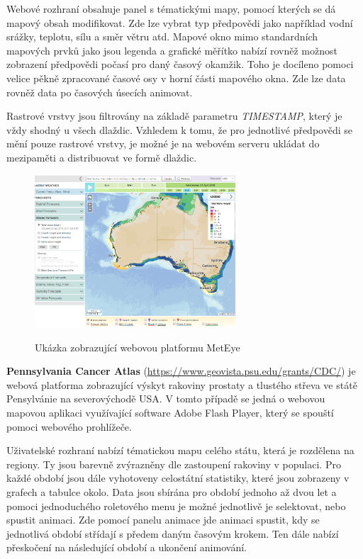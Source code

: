 Webové rozhraní obsahuje panel s tématickými mapy, pomocí kterých se
dá mapový obsah modifikovat. Zde lze vybrat typ předpovědi jako
například vodní srážky, teplotu, sílu a směr větru atd. Mapové okno
mimo standardních mapových prvků jako jsou legenda a grafické měřítko
nabízí rovněž možnost zobrazení předpovědi počasí pro daný časový
okamžik. Toho je docíleno pomoci velice pěkně zpracované časové osy v
horní části mapového okna. Zde lze data rovněž data po časových
úsecích animovat.

Rastrové vrstvy jsou filtrovány na základě parametru
\textit{TIMESTAMP}, který je vždy shodný u všech dlaždic. Vzhledem k
tomu, že pro jednotlivé předpovědi se mění pouze rastrové vrstvy, je
možné je na webovém serveru ukládat do mezipaměti a distribuovat ve formě dlaždic.

\begin{figure}[h!]  \centering
\includegraphics[width=0.67\textwidth]{../img/meteye.png}
	\caption{Ukázka zobrazující webovou platformu MetEye}
	\cite{met-eye}
	\label{fig:met-eye}
\end{figure}

\textbf{Pennsylvania Cancer Atlas}
(\url{https://www.geovista.psu.edu/grants/CDC/}) je webová platforma
zobrazující výskyt rakoviny prostaty a tlustého střeva ve státě
Pensylvánie na severovýchodě USA. V tomto případě se jedná o webovou
mapovou aplikaci využívající software Adobe Flash Player, který se
spouští pomoci webového prohlížeče.

Uživatelské rozhraní nabízí tématickou mapu celého státu, která je
rozdělena na regiony. Ty jsou barevně zvýrazněny dle zastoupení
rakoviny v populaci. Pro každé období jsou dále vyhotoveny celostátní
statistiky, které jsou zobrazeny v grafech a tabulce okolo. Data jsou
sbírána pro období jednoho až dvou let a pomoci jednoduchého
roletového menu je možné jednotlivě je selektovat, nebo spustit
animaci. Zde pomocí panelu animace jde animaci spustit, kdy se
jednotlivá období střídají s předem daným časovým krokem. Ten dále
nabízí přeskočení na následující období a ukončení animování.

